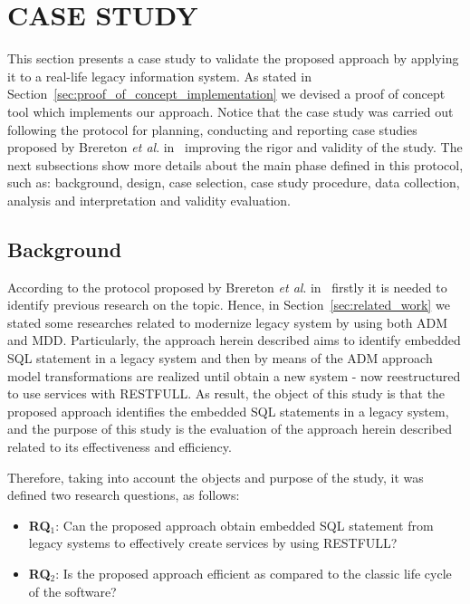 \documentclass[a4paper,twoside]{article}
\begin{document}
\section{\uppercase{Case Study}}

\noindent This section presents a case study to validate the proposed approach by applying it to a real-life legacy information system. As stated in Section~\ref{sec:proof_of_concept_implementation} we devised a proof of concept tool which implements our approach. Notice that the case study was carried out following the protocol for planning, conducting and reporting case studies proposed by Brereton \textit{et al}. in~\cite{case-study-template-2008} improving the rigor and validity of the study. The next subsections show more details about the main phase defined in this protocol, such as: background, design, case selection, case study procedure, data collection, analysis and interpretation and validity evaluation.


\subsection{Background} %
\label{sub:background_case_study}

According to the protocol proposed by Brereton \textit{et al}. in~\cite{case-study-template-2008} firstly it is needed to identify previous research on the topic. Hence, in Section~\ref{sec:related_work} we stated some researches related to modernize legacy system by using both ADM and MDD. Particularly, the approach herein described aims to identify embedded SQL statement in a legacy system and then by means of the ADM approach model transformations are realized until obtain a new system - now reestructured to use services with RESTFULL. As result, the object of this study is that the proposed approach identifies the embedded SQL statements in a legacy system, and the purpose of this study is the evaluation of the approach herein described related to its effectiveness and efficiency.

Therefore, taking into account the objects and purpose of the study, it was defined two research questions, as follows: 

\begin{itemize}
	\item \textbf{RQ$_1$}: Can the proposed approach obtain embedded SQL statement from legacy systems to effectively create services by using RESTFULL?
	\item \textbf{RQ$_2$}: Is the proposed approach efficient as compared to the classic life cycle of the software? 
\end{itemize}
\end{document}
